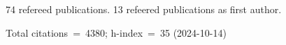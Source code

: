 74 refereed publications. 13 refeered publications as first author.

Total citations~=~4380; h-index~=~35 (2024-10-14)